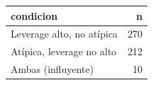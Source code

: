 \begin{tabular}{lr}
\toprule
condicion & n \\
\midrule
Leverage alto, no atípica & 270 \\
Atípica, leverage no alto & 212 \\
Ambas (influyente) & 10 \\
\bottomrule
\end{tabular}
